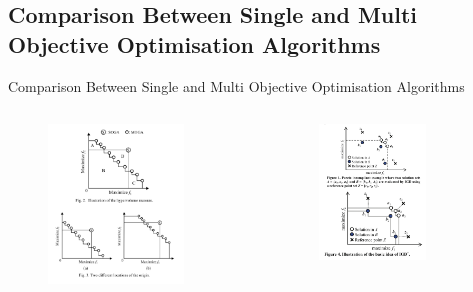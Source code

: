 \documentclass{beamer}
\begin{document}
    \subsection{Comparison Between Single and Multi Objective Optimisation Algorithms}
    \begin{frame}{Comparison Between Single and Multi Objective Optimisation Algorithms}
    
            \begin{columns}
                \begin{column}{0.50\textwidth}
                    \begin{figure}
                        \includegraphics[width=0.8\textwidth]{images/hv.png}
                    \end{figure}
                \end{column}
                \begin{column}{0.50\textwidth}
                    \begin{figure}
                        \includegraphics[width=0.7\textwidth]{images/igd+.png}

\end{figure}
\end{column}
\end{columns}
\end{frame}
\end{document}
